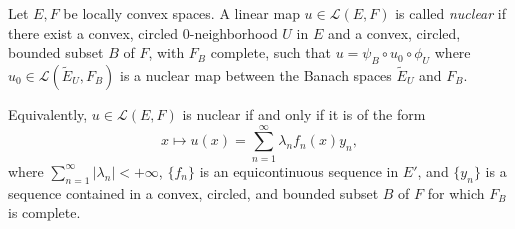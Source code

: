 Let $E, F$ be locally convex spaces. A linear map $u \in \mathcal{L}(E, F)$ is called \emph{nuclear} if there exist a convex, circled $0$-neighborhood $U$ in $E$ and a convex, circled, bounded subset $B$ of $F$, with $F_B$ complete, such that $u = \psi_B \circ u_0 \circ \phi_U$ where $u_0 \in \mathcal{L}(\tilde{E}_U, F_B)$ is a nuclear map between the Banach spaces $\tilde{E}_U$ and $F_B$.

Equivalently, $u \in \mathcal{L}(E, F)$ is nuclear if and only if it is of the form
$$
x \mapsto u(x) = \sum_{n=1}^{\infty} \lambda_n f_n(x) y_n,
$$
where $\sum_{n=1}^{\infty} |\lambda_n| < +\infty$, $\{f_n\}$ is an equicontinuous sequence in $E'$, and $\{y_n\}$ is a sequence contained in a convex, circled, and bounded subset $B$ of $F$ for which $F_B$ is complete.
